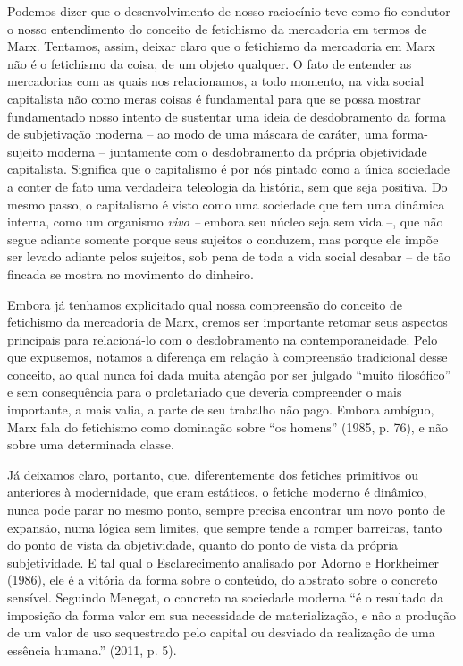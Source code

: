 Podemos dizer que o desenvolvimento de nosso raciocínio teve como fio
condutor o nosso entendimento do conceito de fetichismo da mercadoria em
termos de Marx. Tentamos, assim, deixar claro que o fetichismo da
mercadoria em Marx não é o fetichismo da coisa, de um objeto qualquer. O
fato de entender as mercadorias com as quais nos relacionamos, a todo
momento, na vida social capitalista não como meras coisas é fundamental
para que se possa mostrar fundamentado nosso intento de sustentar uma
ideia de desdobramento da forma de subjetivação moderna -- ao modo de
uma máscara de caráter, uma forma-sujeito moderna -- juntamente com o
desdobramento da própria objetividade capitalista. Significa que o
capitalismo é por nós pintado como a única sociedade a conter de fato
uma verdadeira teleologia da história, sem que seja positiva. Do mesmo
passo, o capitalismo é visto como uma sociedade que tem uma dinâmica
interna, como um organismo \emph{vivo --} embora seu núcleo seja sem
vida --, que não segue adiante somente porque seus sujeitos o conduzem,
mas porque ele impõe ser levado adiante pelos sujeitos, sob pena de toda
a vida social desabar -- de tão fincada se mostra no movimento do
dinheiro.

Embora já tenhamos explicitado qual nossa compreensão do conceito de
fetichismo da mercadoria de Marx, cremos ser importante retomar seus
aspectos principais para relacioná-lo com o desdobramento na
contemporaneidade. Pelo que expusemos, notamos a diferença em relação à
compreensão tradicional desse conceito, ao qual nunca foi dada muita
atenção por ser julgado ``muito filosófico'' e sem consequência para o
proletariado que deveria compreender o mais importante, a mais valia, a
parte de seu trabalho não pago. Embora ambíguo, Marx fala do fetichismo
como dominação sobre ``os homens'' (1985, p. 76), e não sobre uma
determinada classe.

Já deixamos claro, portanto, que, diferentemente dos fetiches primitivos
ou anteriores à modernidade, que eram estáticos, o fetiche moderno é
dinâmico, nunca pode parar no mesmo ponto, sempre precisa encontrar um
novo ponto de expansão, numa lógica sem limites, que sempre tende a
romper barreiras, tanto do ponto de vista da objetividade, quanto do
ponto de vista da própria subjetividade. E tal qual o Esclarecimento
analisado por Adorno e Horkheimer (1986), ele é a vitória da forma sobre
o conteúdo, do abstrato sobre o concreto sensível. Seguindo Menegat, o
concreto na sociedade moderna ``é o resultado da imposição da forma
valor em sua necessidade de materialização, e não a produção de um valor
de uso sequestrado pelo capital ou desviado da realização de uma
essência humana.'' (2011, p. 5).


